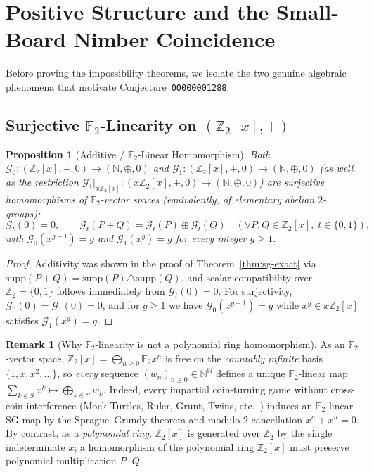 \documentclass[11pt,a4paper]{article}
\newtheorem{proposition}[theorem]{Proposition}
\theoremstyle{definition}
\newtheorem{remark}[theorem]{Remark}
\newcommand{\F}{\mathbb{F}}
\newcommand{\Z}{\mathbb{Z}}
\newcommand{\N}{\mathbb{N}}
\newcommand{\SG}{\mathcal{G}}
\newcommand{\supp}{\mathrm{supp}}
\begin{document}
\section{Positive Structure and the Small-Board Nimber Coincidence}

Before proving the impossibility theorems, we isolate the two genuine algebraic phenomena
that motivate Conjecture~\texttt{00000001288}.

\subsection{Surjective $\F_2$-Linearity on $(\Z_2[x],+)$}

\begin{proposition}[Additive / $\F_2$-Linear Homomorphism]
\label{prop:linear}
Both $\SG_0 : (\Z_2[x],+,0) \to (\N,\oplus,0)$ and
$\SG_1 : (\Z_2[x],+,0) \to (\N,\oplus,0)$ (as well as the restriction
$\SG_1|_{x\Z_2[x]} : (x\Z_2[x],+,0) \to (\N,\oplus,0)$) are surjective homomorphisms of
$\F_2$-vector spaces (equivalently, of elementary abelian $2$-groups):
\[
  \SG_t(0) = 0, \qquad \SG_t(P + Q) = \SG_t(P) \oplus \SG_t(Q) \quad
  (\forall P,Q \in \Z_2[x],\; t \in \{0,1\}),
\]
with $\SG_0(x^{g-1}) = g$ and $\SG_1(x^g) = g$ for every integer $g \ge 1$.
\end{proposition}

\begin{proof}
Additivity was shown in the proof of Theorem~\ref{thm:sg-exact} via
$\supp(P+Q) = \supp(P)\triangle\supp(Q)$, and scalar compatibility over $\Z_2 = \{0,1\}$
follows immediately from $\SG_t(0) = 0$. For surjectivity, $\SG_0(0) = \SG_1(0) = 0$, and
for $g \ge 1$ we have $\SG_0(x^{g-1}) = g$ while $x^g \in x\Z_2[x]$ satisfies
$\SG_1(x^g) = g$.
\end{proof}

\begin{remark}[Why $\F_2$-linearity is not a polynomial ring homomorphism]
As an $\F_2$-vector space, $\Z_2[x] = \bigoplus_{n\ge 0} \F_2 x^n$ is free on the
\emph{countably infinite} basis $\{1,x,x^2,\dots\}$, so \emph{every} sequence
$(w_n)_{n\ge 0} \in \N^\N$ defines a unique $\F_2$-linear map
$\sum_{k\in S} x^k \mapsto \bigoplus_{k\in S} w_k$. Indeed, every impartial coin-turning
game without cross-coin interference (Mock Turtles, Ruler, Grunt, Twins, etc.~\cite{WW})
induces an $\F_2$-linear SG map by the Sprague--Grundy theorem and modulo-$2$ cancellation
$x^n + x^n = 0$. By contrast, as a \emph{polynomial ring}, $\Z_2[x]$ is generated over
$\Z_2$ by the single indeterminate $x$; a homomorphism of the polynomial ring $\Z_2[x]$
must preserve polynomial multiplication $P \cdot Q$.
\end{remark}
\end{document}
